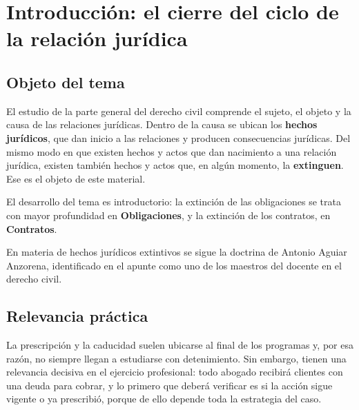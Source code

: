 \documentclass[12pt,oneside]{book}
\begin{document}
\tableofcontents


\chapter[Introducción a la extinción de las relaciones jurídicas]{Introducción: el cierre del ciclo de la relación jurídica}

\section{Objeto del tema}

El estudio de la parte general del derecho civil comprende el sujeto, el objeto y la causa de las relaciones jurídicas. Dentro de la causa se ubican los \textbf{hechos jurídicos}, que dan inicio a las relaciones y producen consecuencias jurídicas. Del mismo modo en que existen hechos y actos que dan nacimiento a una relación jurídica, existen también hechos y actos que, en algún momento, la \textbf{extinguen}. Ese es el objeto de este material.

\begin{note}
El desarrollo del tema es introductorio: la extinción de las obligaciones se trata con mayor profundidad en \textbf{Obligaciones}, y la extinción de los contratos, en \textbf{Contratos}.
\end{note}

En materia de hechos jurídicos extintivos se sigue la doctrina de Antonio Aguiar Anzorena, identificado en el apunte como uno de los maestros del docente en el derecho civil.

\section{Relevancia práctica}

La prescripción y la caducidad suelen ubicarse al final de los programas y, por esa razón, no siempre llegan a estudiarse con detenimiento. Sin embargo, tienen una relevancia decisiva en el ejercicio profesional: todo abogado recibirá clientes con una deuda para cobrar, y lo primero que deberá verificar es si la acción sigue vigente o ya prescribió, porque de ello depende toda la estrategia del caso.
\end{document}
